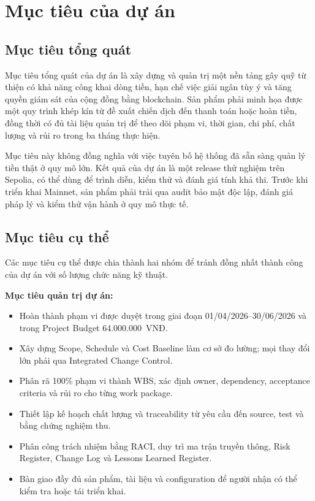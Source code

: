 \section{Mục tiêu của dự án}

\subsection{Mục tiêu tổng quát}

Mục tiêu tổng quát của dự án là xây dựng và quản trị một nền tảng gây quỹ từ thiện có khả năng công khai dòng tiền, hạn chế việc giải ngân tùy ý và tăng quyền giám sát của cộng đồng bằng blockchain. Sản phẩm phải minh họa được một quy trình khép kín từ đề xuất chiến dịch đến thanh toán hoặc hoàn tiền, đồng thời có đủ tài liệu quản trị để theo dõi phạm vi, thời gian, chi phí, chất lượng và rủi ro trong ba tháng thực hiện.

Mục tiêu này không đồng nghĩa với việc tuyên bố hệ thống đã sẵn sàng quản lý tiền thật ở quy mô lớn. Kết quả của dự án là một release thử nghiệm trên Sepolia, có thể dùng để trình diễn, kiểm thử và đánh giá tính khả thi. Trước khi triển khai Mainnet, sản phẩm phải trải qua audit bảo mật độc lập, đánh giá pháp lý và kiểm thử vận hành ở quy mô thực tế.

\iffalse
\subsection{Mục tiêu cụ thể}

Các mục tiêu cụ thể được chia thành hai nhóm để tránh đồng nhất thành công của dự án với số lượng chức năng kỹ thuật.

\textbf{Mục tiêu quản trị dự án:}

\begin{itemize}
  \item Hoàn thành phạm vi được duyệt trong giai đoạn 01/04/2026--30/06/2026 và trong Project Budget 64.000.000~VNĐ.
  \item Xây dựng Scope, Schedule và Cost Baseline làm cơ sở đo lường; mọi thay đổi lớn phải qua Integrated Change Control.
  \item Phân rã 100\% phạm vi thành WBS, xác định owner, dependency, acceptance criteria và rủi ro cho từng work package.
  \item Thiết lập kế hoạch chất lượng và traceability từ yêu cầu đến source, test và bằng chứng nghiệm thu.
  \item Phân công trách nhiệm bằng RACI, duy trì ma trận truyền thông, Risk Register, Change Log và Lessons Learned Register.
  \item Bàn giao đầy đủ sản phẩm, tài liệu và configuration để người nhận có thể kiểm tra hoặc tái triển khai.
\end{itemize}

